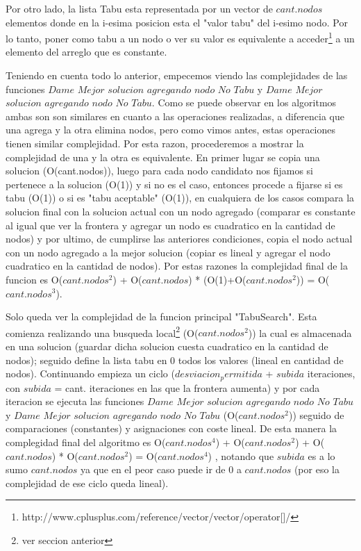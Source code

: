  Por otro lado, la lista Tabu esta representada por un vector de $cant.nodos$ elementos donde en la i-esima posicion esta el "valor tabu" del i-esimo nodo. Por lo tanto, poner como tabu a un nodo o ver su valor es equivalente a acceder\footnote{http://www.cplusplus.com/reference/vector/vector/operator[]/} a un elemento del arreglo que es constante.\newline

 Teniendo en cuenta todo lo anterior, empecemos viendo las complejidades de las funciones $Dame$ $Mejor$ $solucion$ $agregando$ $nodo$ $No$ $Tabu$ y $Dame$ $Mejor$ $solucion$ $agregando$ $nodo$ $No$ $Tabu$. Como se puede observar en los algoritmos ambas son son similares en cuanto a las operaciones realizadas, a diferencia que una agrega y la otra elimina nodos, pero como vimos antes, estas operaciones tienen similar complejidad. Por esta razon, procederemos a mostrar la complejidad de una y la otra es equivalente.\newline
 En primer lugar se copia una solucion (O(cant.nodos)), luego para cada nodo candidato nos fijamos si pertenece a la solucion (O(1)) y si no es el caso, entonces procede a fijarse si es tabu (O(1)) o si es "tabu aceptable" (O(1)), en cualquiera de los casos compara la solucion final con la solucion actual con un nodo agregado (comparar es constante al igual que ver la frontera y agregar un nodo es cuadratico en la cantidad de nodos) y por ultimo, de cumplirse las anteriores condiciones, copia el nodo actual con un nodo agregado a la mejor solucion (copiar es lineal y agregar el nodo cuadratico en la cantidad de nodos). \newline
 Por estas razones la complejidad final de la funcion es O($cant.nodos$$^{2}$) + O($cant.nodos$) * (O(1)+O($cant.nodos$$^{2}$)) = O($cant.nodos$$^{3}$).\newline

 Solo queda ver la complejidad de la funcion principal "TabuSearch". Esta comienza realizando una busqueda local\footnote{ver seccion anterior} (O($cant.nodos$$^{2}$)) la cual es almacenada en una solucion (guardar dicha solucion cuesta cuadratico en la cantidad de nodos); seguido define la lista tabu en 0 todos los valores (lineal en cantidad de nodos). Continuando empieza un ciclo ($desviacion_permitida$ + $subida$ iteraciones, con $subida$ = cant. iteraciones en las que la frontera aumenta) y por cada iteracion se ejecuta las funciones $Dame$ $Mejor$ $solucion$ $agregando$ $nodo$ $No$ $Tabu$ y $Dame$ $Mejor$ $solucion$ $agregando$ $nodo$ $No$ $Tabu$ (O($cant.nodos$$^{2}$)) seguido de comparaciones (constantes) y asignaciones con coste lineal. \newline
 De esta manera la complegidad final del algoritmo es O($cant.nodos$$^{4}$) + O($cant.nodos$$^{2}$) + O($cant.nodos$) * O($cant.nodos$$^{2}$) = O($cant.nodos$$^{4}$) , notando que $subida$ es a lo sumo $cant.nodos$ ya que en el peor caso puede ir de 0 a $cant.nodos$ (por eso la complejidad de ese ciclo queda lineal). 


